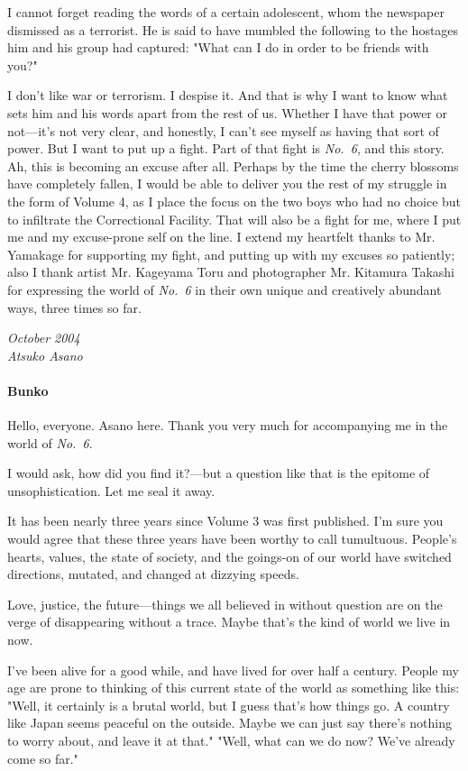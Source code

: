 I cannot forget reading the words of a certain adolescent, whom the
newspaper dismissed as a terrorist. He is said to have mumbled the
following to the hostages him and his group had captured: "What can I do
in order to be friends with you?"

I don't like war or terrorism. I despise it. And that is why I want to
know what sets him and his words apart from the rest of us. Whether I
have that power or not---it's not very clear, and honestly, I can't see
myself as having that sort of power. But I want to put up a fight. Part
of that fight is \emph{No.~6}, and this story. Ah, this is becoming an excuse
after all. Perhaps by the time the cherry blossoms have completely
fallen, I would be able to deliver you the rest of my struggle in the
form of Volume 4, as I place the focus on the two boys who had no choice
but to infiltrate the Correctional Facility. That will also be a fight
for me, where I put me and my excuse-prone self on the line. I extend my
heartfelt thanks to Mr. Yamakage for supporting my fight, and putting up
with my excuses so patiently; also I thank artist Mr. Kageyama Toru and
photographer Mr. Kitamura Takashi for expressing the world of \emph{No.~6} in
their own unique and creatively abundant ways, three times so far.

\myspace

\emph{October 2004\\
	Atsuko Asano}

\paragraph{Bunko}

Hello, everyone. Asano here. Thank you very much for accompanying me in
the world of \emph{No.~6}.

I would ask, how did you find it?---but a question like that is the
epitome of unsophistication. Let me seal it away.

It has been nearly three years since Volume 3 was first published. I'm
sure you would agree that these three years have been worthy to call
tumultuous. People's hearts, values, the state of society, and the
goings-on of our world have switched directions, mutated, and changed at
dizzying speeds.

Love, justice, the future---things we all believed in without question are
on the verge of disappearing without a trace. Maybe that's the kind of
world we live in now.

I've been alive for a good while, and have lived for over half a
century. People my age are prone to thinking of this current state of
the world as something like this: "Well, it certainly is a brutal world,
but I guess that's how things go. A country like Japan seems peaceful on
the outside. Maybe we can just say there's nothing to worry about, and
leave it at that." "Well, what can we do now? We've already come so
far."

